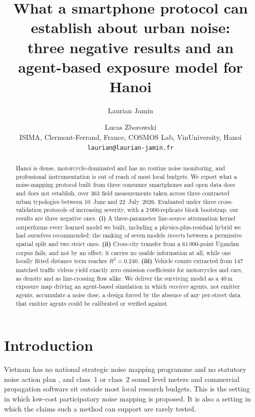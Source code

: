 \documentclass[10pt,twocolumn,a4paper]{article}
\title{\vspace{-1.2em}\bfseries What a smartphone protocol can establish about
urban noise:\\ three negative results and an agent-based exposure model for Hanoi
\vspace{-.4em}}
\author{%
  Laurian Jamin \and Lucas Zborowski\\[.2em]
  {\small ISIMA, Clermont-Ferrand, France, COSMOS Lab, VinUniversity, Hanoi}\\
  {\small\texttt{laurian@laurian-jamin.fr}}
  \vspace{-1em}}
\date{}
\begin{document}
\maketitle

\begin{abstract}\small\noindent
Hanoi is dense, motorcycle-dominated and has no routine noise monitoring, and
professional instrumentation is out of reach of most local budgets. We report
what a noise-mapping protocol built from three consumer smartphones and open
data does and does not establish, over 363 field measurements taken across three
contrasted urban typologies between 10~June and 22~July~2026. Evaluated under
three cross-validation protocols of increasing severity, with a
2\,000-replicate block bootstrap, our results are three negative ones.
\textbf{(i)} A three-parameter line-source attenuation kernel outperforms every
learned model we built, including a physics-plus-residual hybrid we had
ourselves recommended: the ranking of seven models \emph{inverts} between a
permissive spatial split and two strict ones. \textbf{(ii)} Cross-city transfer
from a 61\,000-point Ugandan corpus fails, and not by an offset: it carries no usable information at all, while one locally fitted distance term reaches
$R^2 = 0.240$. \textbf{(iii)} Vehicle counts extracted from 147 matched traffic
videos yield exactly zero emission coefficients for motorcycles and cars, as
density and as line-crossing flow alike. We deliver the surviving model as a
40\,m exposure map driving an agent-based simulation in which \emph{receiver}
agents, not emitter agents, accumulate a noise dose, a design forced by the
absence of any per-street data that emitter agents could be calibrated or
verified against.
\end{abstract}

\vspace{.4em}

\section{Introduction}

Vietnam has no national strategic noise mapping programme and no statutory noise
action plan \citep{nguyen2025law}, and class~1 or class~2 sound level meters and
commercial propagation software sit outside most local research budgets. This is the setting in which low-cost participatory noise mapping is proposed. It
is also a setting in which the claims such a method can support are rarely
tested.
\end{document}
